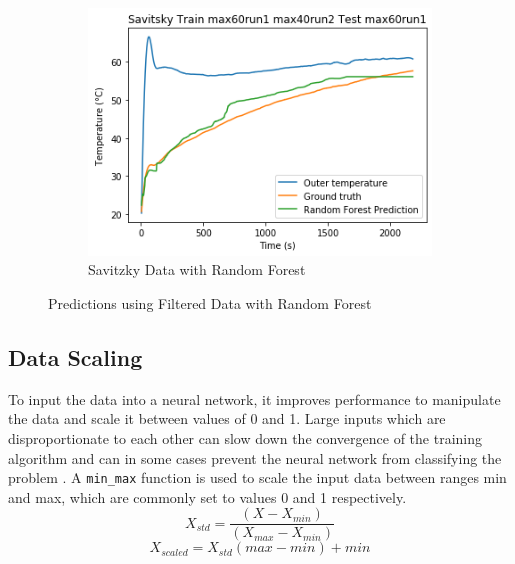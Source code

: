 \begin{figure}[ht]
\begin{subfigure}{.34\linewidth}
    	\includegraphics[width=\linewidth]{filter/savitzky_RF.png}
    	\caption{Savitzky Data with Random Forest}
    \end{subfigure}
    \caption{Predictions using Filtered Data with Random Forest}
\end{figure}\clearpage
\subsection{Data Scaling}
To input the data into a neural network, it improves performance to manipulate the data and scale it between values of 0 and 1. Large inputs which are disproportionate to each other can slow down the convergence of the training algorithm and can in some cases prevent the neural network from classifying the problem \cite{hands_on_scaling}. A \lstinline{min_max} function is used to scale the input data between ranges min and max, which are commonly set to values 0 and 1 respectively. 
\begin{equation} \label{scaled_eq1}
    X_{std} = \frac{(X - X_{min})}{(X_{max} - X_{min})}
\end{equation}
\begin{equation} \label{scaled_eq2} 
    X_{scaled} = X_{std} (max - min) + min
\end{equation}

